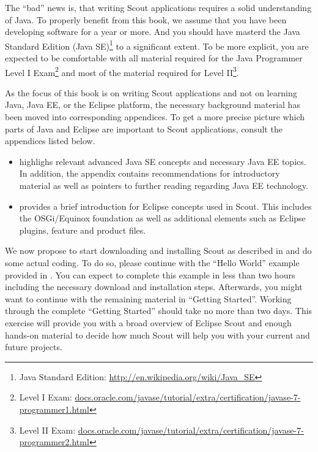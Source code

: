 \documentclass[a4paper,10pt,twoside]{book}
\begin{document}
The ``bad'' news is, that writing Scout applications requires a solid understanding of Java.
To properly benefit from this book, we assume that you have been developing software for a year or more.
And you should have masterd the Java Standard Edition 
(Java SE)\footnote{Java Standard Edition: \url{http://en.wikipedia.org/wiki/Java_SE}} to a significant extent. 
To be more explicit, you are expected to be comfortable with all material required for the Java Programmer Level I 
Exam\footnote{Level I Exam: \url{docs.oracle.com/javase/tutorial/extra/certification/javase-7-programmer1.html}}
and most of the material required for 
Level II\footnote{Level II Exam: \url{docs.oracle.com/javase/tutorial/extra/certification/javase-7-programmer2.html}}.

As the focus of this book is on writing Scout applications and not on learning Java, Java EE, or the Eclipse platform, the necessary background material has been moved into corresponding appendices.
To get a more precise picture which parts of Java and Eclipse are important to Scout applications, consult the appendices listed below.

\begin{itemize}
  \item {} highlighs relevant advanced Java SE concepts and necessary Java EE topics. 
        In addition, the appendix contains recommendations for introductory material as well as pointers to further reading regarding Java EE technology.
  \item {} provides a brief introduction for Eclipse concepts used in Scout. 
        This includes the OSGi/Equinox foundation as well as additional elements such as Eclipse plugins, feature and product files.
\end{itemize}

We now propose to start downloading and installing Scout as described in  and do some actual coding.
To do so, please continue with the ``Hello World'' example provided in .
You can expect to complete this example in less than two hours including the necessary download and installation steps.
Afterwards, you might want to continue with the remaining material in ``Getting Started''. 
Working through the complete ``Getting Started'' should take no more than two days. 
This exercise will provide you with a broad overview of Eclipse Scout and enough hands-on material to decide how much Scout will help you with your current and future projects.
\end{document}
